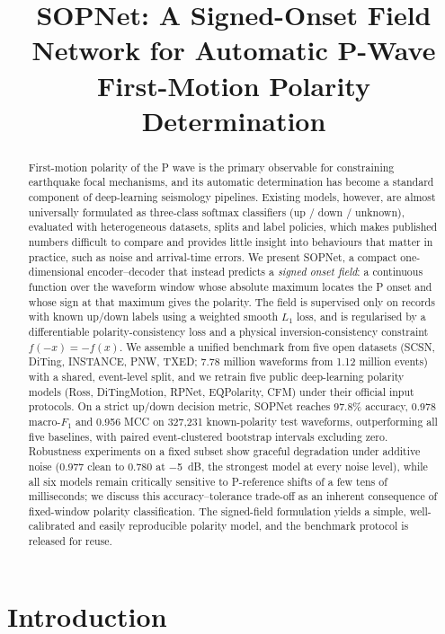 \documentclass[11pt]{article}
\title{SOPNet: A Signed-Onset Field Network for Automatic P-Wave \\
First-Motion Polarity Determination}
\author{\TBD{author list}}
\date{\TBD{date}}
\begin{document}
\maketitle

\begin{abstract}
First-motion polarity of the P wave is the primary observable for constraining
earthquake focal mechanisms, and its automatic determination has become a
standard component of deep-learning seismology pipelines. Existing models,
however, are almost universally formulated as three-class softmax classifiers
(up / down / unknown), evaluated with heterogeneous datasets, splits and label
policies, which makes published numbers difficult to compare and provides
little insight into behaviours that matter in practice, such as noise and
arrival-time errors. We present SOPNet, a compact one-dimensional
encoder--decoder that instead predicts a \emph{signed onset field}: a
continuous function over the waveform window whose absolute maximum locates the
P onset and whose sign at that maximum gives the polarity. The field is
supervised only on records with known up/down labels using a weighted smooth
$L_1$ loss, and is regularised by a differentiable polarity-consistency loss
and a physical inversion-consistency constraint $f(-x) = -f(x)$. We assemble a
unified benchmark from five open datasets (SCSN, DiTing, INSTANCE, PNW, TXED;
7.78 million waveforms from 1.12 million events) with a shared,
event-level split, and we retrain five public deep-learning polarity models
(Ross, DiTingMotion, RPNet, EQPolarity, CFM) under their official input
protocols. On a strict up/down decision metric, SOPNet reaches
97.8\% accuracy, 0.978 macro-$F_1$ and 0.956 MCC on
327{,}231 known-polarity test waveforms, outperforming all five baselines,
with paired event-clustered bootstrap intervals excluding zero. Robustness
experiments on a fixed subset show graceful degradation under additive noise
(0.977 clean to 0.780 at \SI{-5}{dB}, the strongest model at every noise
level), while all six models remain critically sensitive to P-reference
shifts of a few tens of milliseconds; we discuss this accuracy--tolerance
trade-off as an inherent consequence of fixed-window polarity
classification. The signed-field
formulation yields a simple, well-calibrated and easily reproducible polarity
model, and the benchmark protocol is released for reuse.
\end{abstract}

\section{Introduction}
\label{sec:intro}
\end{document}
